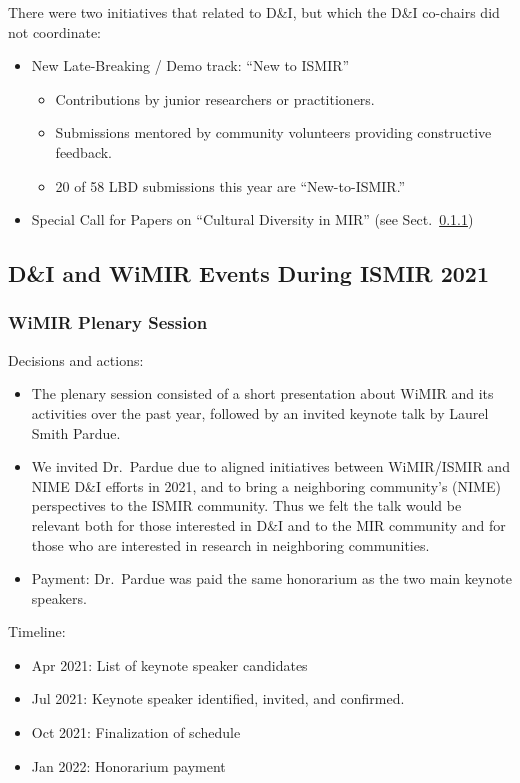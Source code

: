 \documentclass[%
10pt,								%
]
{scrartcl}
\begin{document}
        There were two initiatives that related to D\&I, but which the D\&I co-chairs did not coordinate:
        \begin{itemize}
            \item   New Late-Breaking / Demo track: ``New to ISMIR''
                \begin{itemize}
                    \item   Contributions by junior researchers or practitioners.
                    \item   Submissions mentored by community volunteers providing constructive feedback.
                    \item   20 of 58 LBD submissions this year are ``New-to-ISMIR.''
                \end{itemize}
            \item   Special Call for Papers on ``Cultural Diversity in MIR'' (see Sect.~\ref{})
        \end{itemize}

    \subsection{D\&I and WiMIR Events During ISMIR 2021}
        \subsubsection{WiMIR Plenary Session}
            Decisions and actions:
            \begin{itemize}
                \item   The plenary session consisted of a short presentation about WiMIR and its activities over the past year, followed by an invited keynote talk by Laurel Smith Pardue.
                \item   We invited Dr.\ Pardue due to aligned initiatives between WiMIR/ISMIR and NIME D\&I efforts in 2021, and to bring a neighboring community’s (NIME) perspectives to the ISMIR community. Thus we felt the talk would be relevant both for those interested in D\&I and to the MIR community and for those who are interested in research in neighboring communities.
                \item   Payment: Dr.\ Pardue was paid the same honorarium as the two main keynote speakers.
            \end{itemize}

            Timeline:
            \begin{itemize}
                \item   Apr 2021: List of keynote speaker candidates
                \item   Jul 2021: Keynote speaker identified, invited, and confirmed.
                \item   Oct 2021: Finalization of schedule
                \item   Jan 2022: Honorarium payment 
            \end{itemize}
\end{document}
